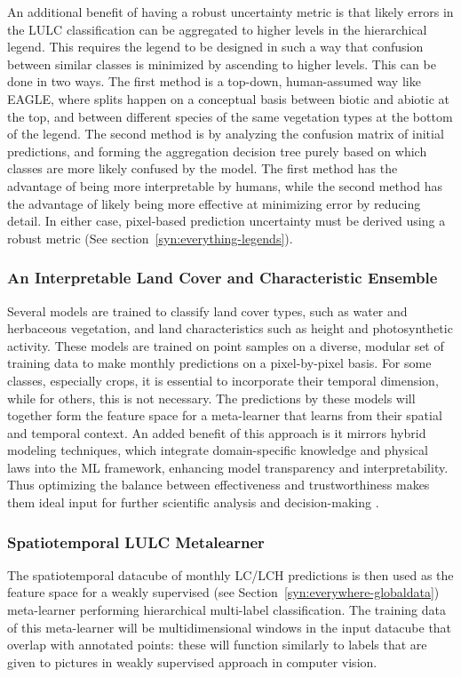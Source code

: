             An additional benefit of having a robust uncertainty metric is that likely errors in the LULC classification can be aggregated to higher levels in the hierarchical legend. This requires the legend to be designed in such a way that confusion between similar classes is minimized by ascending to higher levels. This can be done in two ways. The first method is a top-down, human-assumed way like EAGLE, where splits happen on a conceptual basis between biotic and abiotic at the top, and between different species of the same vegetation types at the bottom of the legend. The second method is by analyzing the confusion matrix of initial predictions, and forming the aggregation decision tree purely based on which classes are more likely confused by the model. The first method has the advantage of being more interpretable by humans, while the second method has the advantage of likely being more effective at minimizing error by reducing detail. In either case, pixel-based prediction uncertainty must be derived using a robust metric (See section\@~\ref{syn:everything-legends}).

        \subsubsection{An Interpretable Land Cover and Characteristic Ensemble}
            Several models are trained to classify land cover types, such as water and herbaceous vegetation, and land characteristics such as height and photosynthetic activity. These models are trained on point samples on a diverse, modular set of training data to make monthly predictions on a pixel-by-pixel basis. For some classes, especially crops, it is essential to incorporate their temporal dimension, while for others, this is not necessary. The predictions by these models will together form the feature space for a meta-learner that learns from their spatial and temporal context. 
            An added benefit of this approach is it mirrors hybrid modeling techniques, which integrate domain-specific knowledge and physical laws into the ML framework, enhancing model transparency and interpretability. Thus optimizing the balance between effectiveness and trustworthiness makes them ideal input for further scientific analysis and decision-making \citep{ferchichi2022forecasting}.

        \subsubsection{Spatiotemporal LULC Metalearner}
            The spatiotemporal datacube of monthly LC/LCH predictions is then used as the feature space for a weakly supervised (see Section\@~\ref{syn:everywhere-globaldata}) meta-learner performing hierarchical multi-label classification. The training data of this meta-learner will be multidimensional windows in the input datacube that overlap with annotated points: these will function similarly to labels that are given to pictures in weakly supervised approach in computer vision. 
            
